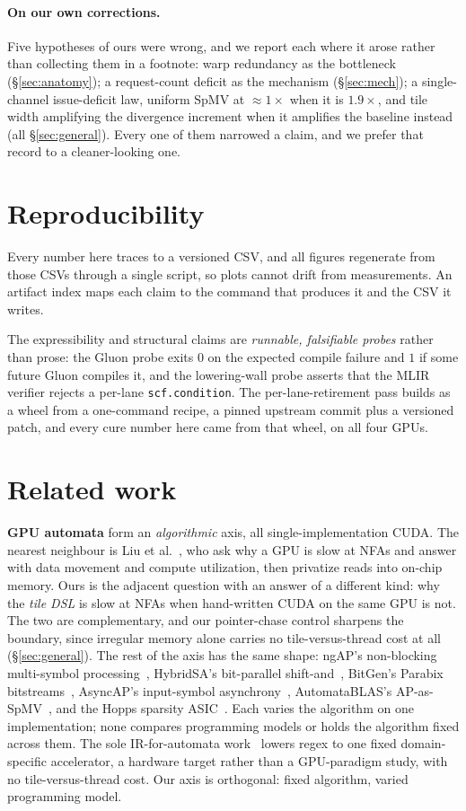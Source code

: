 \documentclass[sigplan,review,nonacm,10pt]{acmart}
\begin{document}
\paragraph{On our own corrections.} Five hypotheses of ours were wrong, and we report each
where it arose rather than collecting them in a footnote: warp redundancy as the bottleneck
(\S\ref{sec:anatomy}); a request-count deficit as the mechanism (\S\ref{sec:mech}); a
single-channel issue-deficit law, uniform SpMV at ${\approx}1\times$ when it is
$1.9\times$, and tile width amplifying the divergence increment when it amplifies the
baseline instead (all \S\ref{sec:general}). Every one of them narrowed a claim, and we
prefer that record to a cleaner-looking one.

\section{Reproducibility}\label{sec:repro}
Every number here traces to a versioned CSV, and all figures regenerate from those CSVs
through a single script, so plots cannot drift from measurements. An artifact index maps
each claim to the command that produces it and the CSV it writes.

The expressibility and structural claims are \emph{runnable, falsifiable probes} rather than
prose: the Gluon probe exits $0$ on the expected compile failure and $1$ if some future
Gluon compiles it, and the lowering-wall probe asserts that the MLIR verifier rejects a
per-lane \texttt{scf.condition}. The per-lane-retirement pass builds as a wheel from a
one-command recipe, a pinned upstream commit plus a versioned patch, and every cure number
here came from that wheel, on all four GPUs.

\section{Related work}\label{sec:related}
\textbf{GPU automata} form an \emph{algorithmic} axis, all single-implementation CUDA. The
nearest neighbour is Liu et al.~\cite{whyslownfa2020}, who ask why a GPU is slow at NFAs and
answer with data movement and compute utilization, then privatize reads into on-chip memory.
Ours is the adjacent question with an answer of a different kind: why the \emph{tile DSL} is
slow at NFAs when hand-written CUDA on the same GPU is not. The two are complementary, and
our pointer-chase control sharpens the boundary, since irregular memory alone carries no
tile-versus-thread cost at all (\S\ref{sec:general}). The rest of the axis has the same
shape: ngAP's non-blocking multi-symbol processing~\cite{ngap2024}, HybridSA's bit-parallel
shift-and~\cite{hybridsa2024}, BitGen's Parabix bitstreams~\cite{bitgen2025}, AsyncAP's
input-symbol asynchrony~\cite{asyncap2023}, AutomataBLAS's AP-as-SpMV~\cite{automatablas2025},
and the Hopps sparsity ASIC~\cite{hopps2025}. Each varies the algorithm on one
implementation; none compares programming models or holds the algorithm fixed across them.
The sole IR-for-automata work~\cite{mlirregex2025} lowers regex to one fixed
domain-specific accelerator, a hardware target rather than a GPU-paradigm study, with no
tile-versus-thread cost. Our axis is orthogonal: fixed algorithm, varied programming model.
\end{document}
